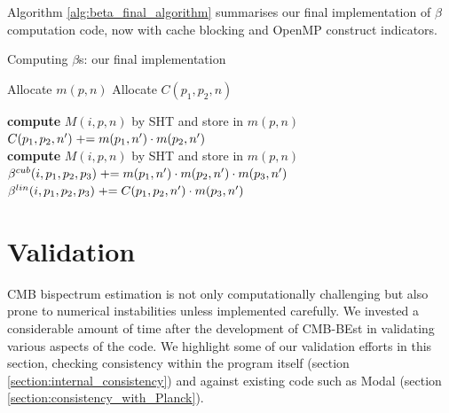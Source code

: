 Algorithm \ref{alg:beta_final_algorithm} summarises our final implementation of $\beta$ computation code, now with cache blocking and OpenMP construct indicators.

\begin{algorithm}[htbp]
	\caption{Computing $\beta$s: our final implementation}
	\label{alg:beta_final_algorithm}
	\begin{algorithmic}[1] %
		\State Allocate $m(p,n)$ 
		\State Allocate $C(p_1,p_2,n)$ 
		\\

		\State \textbf{compute} $M(i,p,n)$ by SHT and store in $m(p,n)$
		\EndFor
		\\
		\State $C(p_1,p_2,n') \mathrel{+}= m(p_1,n') \cdot m(p_2,n')$
		\EndFor
		\EndFor
		\EndFor
		\EndFor
		\\
		\State \textbf{compute} $M(i,p,n)$ by SHT and store in $m(p,n)$
		\EndFor
		\\
		\State $\beta^{cub}(i, p_1, p_2, p_3) \mathrel{+}= m(p_1,n') \cdot m(p_2,n') \cdot m(p_3,n')$
		\State $\beta^{lin}(i, p_1, p_2, p_3) \mathrel{+}= C(p_1, p_2, n') \cdot m( p_3, n')$
		\EndFor
		\EndFor
		\EndFor
		\EndFor
	\end{algorithmic}
\end{algorithm}

\section{Validation} \label{section:validation}

CMB bispectrum estimation is not only computationally challenging but also prone to numerical instabilities unless implemented carefully. We invested a considerable amount of time after the development of CMB-BEst in validating various aspects of the code. We highlight some of our validation efforts in this section, checking consistency within the program itself (section \ref{section:internal_consistency}) and against existing code such as Modal \cite{Fergusson2012} (section \ref{section:consistency_with_Planck}).

